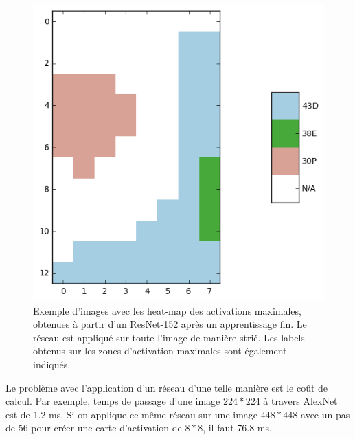 \begin{figure}[!htb]
\begin{minipage}[c]{.33\linewidth}
  \end{minipage} \hfill
  \begin{minipage}[c]{.32\linewidth}
    \includegraphics[width=\linewidth]{figures/sample3_labels.png}
  \end{minipage}


	\caption{Exemple d'images avec les heat-map des activations maximales, obtenues à partir d'un ResNet-152 après un apprentissage fin. Le réseau est appliqué sur toute l'image de manière strié. Les labels obtenus sur les zones d'activation maximales sont également indiqués.
	\label{fig:heatmaps}}
	
\end{figure}



Le problème avec l'application d'un réseau d’une telle manière est le coût de calcul.
Par exemple, temps de passage d'une image $224*224$ à travers AlexNet est de 1.2 ms. 
Si on applique ce même réseau sur une image $448*448$ avec un pas de 56 pour créer une carte d’activation de $8*8$, il faut 76.8 ms.


